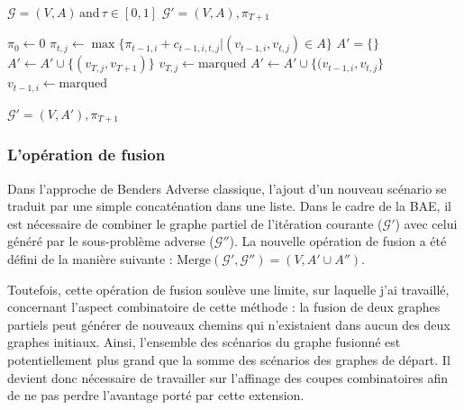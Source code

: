 \documentclass[12pt, a4paper, twoside]{report}
\numberwithin{equation}{section}
\begin{document}
	\begin{algorithm}[H]
		\caption{Adv\_subGraph}
		\label{alg:adv_subgraph}
		\begin{algorithmic}[1]
			\Require $\mathcal{G}=(V, A)\, \text{and}\, \tau\in[0, 1]$
			\Ensure $\mathcal{G}'=(V, A), \pi_{T+1}$
			
			\State $\pi_0 \gets 0$
			\State $\pi_{t, j} \gets \max\{\pi_{t-1, i}+c_{t-1, i, t, j} | (v_{t-1, i}, v_{t, j})\in A\}$
			\EndFor
			\EndFor
			\State $A'=\{\}$
			\State $A'\gets A'\cup \{(v_{T, j}, v_{T+1})\}$
			\State $v_{T, j}\gets\text{marqued}$
			\EndIf
			\State $A'\gets A'\cup \{(v_{t-1, i}, v_{t, j}\}$
			\State $v_{t-1, i}\gets \text{marqued}$
			\EndIf
			\EndFor
			\EndIf
			\EndFor
			\EndFor
			
			\State \Return $\mathcal{G}'=(V, A'), \pi_{T+1}$
		\end{algorithmic}
	\end{algorithm}
	
	\subsubsection{L'opération de fusion}
	
	Dans l'approche de Benders Adverse classique, l'ajout d'un nouveau scénario se traduit par une simple concaténation dans une liste. Dans le cadre de la BAE, il est nécessaire de combiner le graphe partiel de l'itération courante ($\mathcal{G}'$) avec celui généré par le sous-problème adverse ($\mathcal{G}''$). La nouvelle opération de fusion a été défini de la manière suivante : $\text{Merge}(\mathcal{G}', \mathcal{G}'')=(V, A'\cup A'')$.
	
	Toutefois, cette opération de fusion soulève une limite, sur laquelle j'ai travaillé, concernant l'aspect combinatoire de cette méthode \cite{portoleau:tel-04631599} : la fusion de deux graphes partiels peut générer de nouveaux chemins qui n'existaient dans aucun des deux graphes initiaux. Ainsi, l'ensemble des scénarios du graphe fusionné est potentiellement plus grand que la somme des scénarios des graphes de départ. Il devient donc nécessaire de travailler sur l'affinage des coupes combinatoires afin de ne pas perdre l'avantage porté par cette extension.
	
\end{document}
